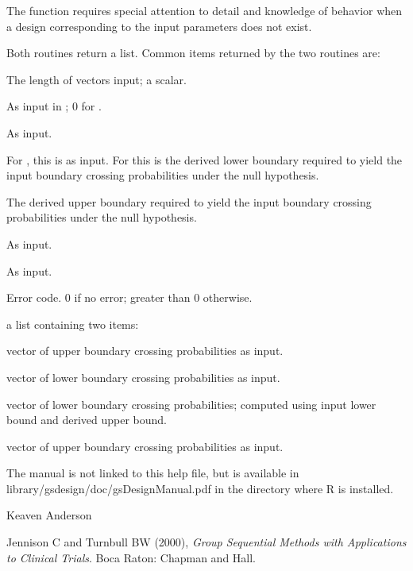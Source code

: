\begin{Details}\relax
The function  requires special attention to detail and knowledge of behavior when a design corresponding to the input parameters does not exist.
\end{Details}
\begin{Value}
Both routines return a list. Common items returned by the two routines are: 
\begin{ldescription}
\item[\code{k}] The length of vectors input; a scalar.
\item[\code{theta}] As input in ; 0 for .
\item[\code{I}] As input.
\item[\code{a}] For , this is as input. For  this is the derived lower boundary required to yield the input boundary crossing probabilities under the null hypothesis.
\item[\code{b}] The derived upper boundary required to yield the input boundary crossing probabilities under the null hypothesis.
\item[\code{tol}] As input.
\item[\code{r}] As input.
\item[\code{error}] Error code. 0 if no error; greater than 0 otherwise.
\item[\code{rates}] a list containing two items:
\item[\code{falsepos}] vector of upper boundary crossing probabilities as input.
\item[\code{trueneg}] vector of lower boundary crossing probabilities as input.
\item[\code{problo}] vector of lower boundary crossing probabilities; computed using input lower bound and derived upper bound.
\item[\code{probhi}] vector of upper boundary crossing probabilities as input.
\end{ldescription}
\end{Value}
\begin{Note}\relax
The manual is not linked to this help file, but is available in library/gsdesign/doc/gsDesignManual.pdf
in the directory where R is installed.
\end{Note}
\begin{Author}\relax
Keaven Anderson 
\end{Author}
\begin{References}\relax
Jennison C and Turnbull BW (2000), \emph{Group Sequential Methods with Applications to Clinical Trials}.
Boca Raton: Chapman and Hall.
\end{References}

